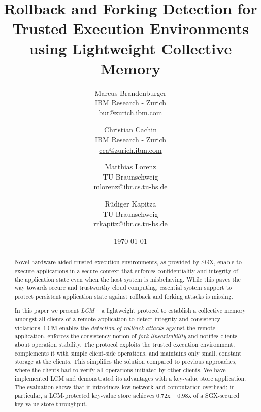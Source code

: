 \documentclass[11pt]{article}
\theoremstyle{plain-boldhead}
\theoremstyle{definition-boldhead}
\begin{document}
\title{\bf Rollback and Forking Detection for Trusted Execution Environments using Lightweight Collective Memory}

\author{
  Marcus Brandenburger\\
  IBM Research - Zurich\\
  \url{bur@zurich.ibm.com}
% 
  \and Christian Cachin\\
  IBM Research - Zurich\\
  \url{cca@zurich.ibm.com}\\
% 
  \and  Matthias Lorenz\\
  TU Braunschweig\\
  \url{mlorenz@ibr.cs.tu-bs.de}\\
% 
  \and  R\"udiger Kapitza\\
  TU Braunschweig\\
  \url{rrkapitz@ibr.cs.tu-bs.de}
}


\date{\today}


\maketitle

\begin{abstract}
Novel hardware-aided trusted execution environments, as provided by \ac{SGX},
enable to execute applications in a secure context that enforces
confidentiality and integrity of the application state even when the host
system is misbehaving.
% 
While this paves the way towards secure and trustworthy cloud
computing, essential system support to protect persistent application state 
against rollback and forking attacks is missing.

In this paper we present \emph{LCM} -- a lightweight protocol to establish a
collective memory amongst all clients of a remote application to detect
integrity and consistency violations.  
% 
LCM enables the \emph{detection of rollback attacks} against the remote
application, enforces the consistency notion of
\emph{fork-linearizability} and notifies clients about operation
stability.  The protocol exploits the trusted execution environment,
complements it with simple client-side operations, and maintains only
small, constant storage at the clients.
This simplifies the solution compared to previous approaches, where
the clients had to
verify all operations initiated by other clients.
% 
We have implemented LCM and demonstrated its advantages with a key-value store
application.  The evaluation shows that it introduces low network and
computation overhead; in particular, a LCM-protected key-value store 
achieves 0.72x -- 0.98x of a SGX-secured key-value store throughput.
\end{abstract}
\end{document}
